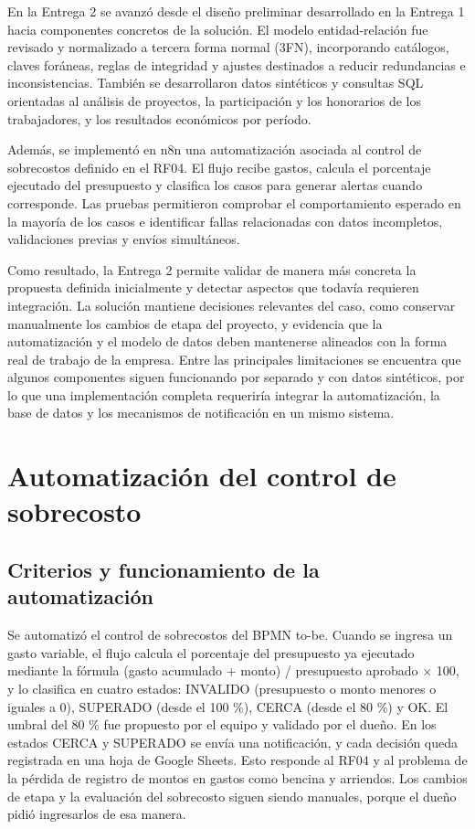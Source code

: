 \documentclass[11pt,letterpaper]{article}
\begin{document}
En la Entrega 2 se avanzó desde el diseño preliminar desarrollado en la Entrega 1 hacia componentes concretos de la solución. El modelo entidad-relación fue revisado y normalizado a tercera forma normal (3FN), incorporando catálogos, claves foráneas, reglas de integridad y ajustes destinados a reducir redundancias e inconsistencias. También se desarrollaron datos sintéticos y consultas SQL orientadas al análisis de proyectos, la participación y los honorarios de los trabajadores, y los resultados económicos por período.


Además, se implementó en n8n una automatización asociada al control de sobrecostos definido en el RF04. El flujo recibe gastos, calcula el porcentaje ejecutado del presupuesto y clasifica los casos para generar alertas cuando corresponde. Las pruebas permitieron comprobar el comportamiento esperado en la mayoría de los casos e identificar fallas relacionadas con datos incompletos, validaciones previas y envíos simultáneos.


Como resultado, la Entrega 2 permite validar de manera más concreta la propuesta definida inicialmente y detectar aspectos que todavía requieren integración. La solución mantiene decisiones relevantes del caso, como conservar manualmente los cambios de etapa del proyecto, y evidencia que la automatización y el modelo de datos deben mantenerse alineados con la forma real de trabajo de la empresa. Entre las principales limitaciones se encuentra que algunos componentes siguen funcionando por separado y con datos sintéticos, por lo que una implementación completa requeriría integrar la automatización, la base de datos y los mecanismos de notificación en un mismo sistema.


\clearpage
{}\section{Automatización del control de sobrecosto}


\subsection{Criterios y funcionamiento de la automatización}

Se automatizó el control de sobrecostos del BPMN to-be. Cuando se ingresa un gasto variable, el flujo calcula el porcentaje del presupuesto ya ejecutado mediante la fórmula (gasto acumulado + monto) / presupuesto aprobado $\times$ 100, y lo clasifica en cuatro estados: INVALIDO (presupuesto o monto menores o iguales a 0), SUPERADO (desde el 100 \%), CERCA (desde el 80 \%) y OK. El umbral del 80 \% fue propuesto por el equipo y validado por el dueño. En los estados CERCA y SUPERADO se envía una notificación, y cada decisión queda registrada en una hoja de Google Sheets. Esto responde al RF04 y al problema de la pérdida de registro de montos en gastos como bencina y arriendos. Los cambios de etapa y la evaluación del sobrecosto siguen siendo manuales, porque el dueño pidió ingresarlos de esa manera.
\end{document}
